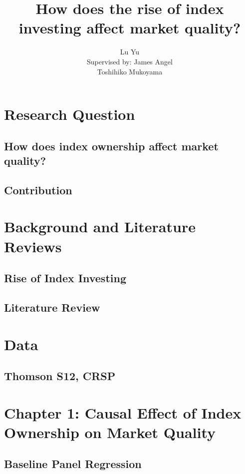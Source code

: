 \documentclass[9pt, dvipsnames]{beamer}
\title{How does the rise of index investing affect market quality?}
\author[Lu Yu]{Lu Yu\\{\vskip 3mm Supervised by: James Angel \\ Toshihiko Mukoyama}}
\begin{document}
    \everymath{\displaystyle}

    
    

    \section{Research Question}\label{sec:research-question}
    \subsection{How does index ownership affect market quality?}
    
    \subsection{Contribution}
    

    \section{Background and Literature Reviews}\label{sec:background-literature}
    \subsection{Rise of Index Investing}
    
    \subsection{Literature Review}
    

    \section{Data}\label{sec:Data}
    \subsection{Thomson S12, CRSP}
    

    \section{Chapter 1: Causal Effect of Index Ownership on Market Quality}\label{sec:Model}
    \subsection{Baseline Panel Regression}
    
    
    
    
    
    
    
    
    
    
\end{document}
